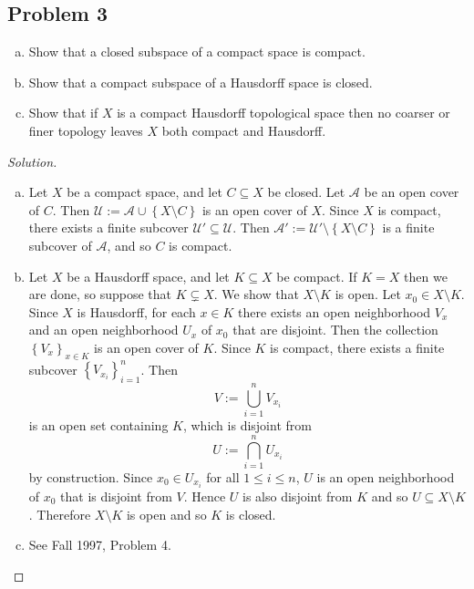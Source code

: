 \documentclass[12pt]{article}
\newcommand\setb[1]{\left \{ #1 \right \}}
\theoremstyle{definition}
\begin{document}
\subsection{Problem 3 \texorpdfstring{\cite{Munkres}}{}}
\begin{enumerate}[a)]
    \item Show that a closed subspace of a compact space is compact.
    \item Show that a compact subspace of a Hausdorff space is closed.
    \item Show that if $X$ is a compact Hausdorff topological space then no coarser or finer topology leaves $X$ both compact and Hausdorff.
\end{enumerate}
\begin{proof}[Solution]
    \noindent
    \begin{enumerate}[a)]
        \item Let $X$ be a compact space, and let $C \subseteq X$ be closed. Let $\mathcal{A}$ be an open cover of $C$. Then $\mathcal{U} := \mathcal{A} \cup \setb{ X \setminus C }$ is an open cover of $X$. Since $X$ is compact, there exists a finite subcover $\mathcal{U}' \subseteq \mathcal{U}$. Then $\mathcal{A}' :=  \mathcal{U}' \setminus \setb{ X \setminus C }$ is a finite subcover of $\mathcal{A}$, and so $C$ is compact.
        \item Let $X$ be a Hausdorff space, and let $K \subseteq X$ be compact. If $K = X$ then we are done, so suppose that $K \subsetneq X$. We show that $X \setminus K$ is open. Let $x_0 \in X \setminus K$. Since $X$ is Hausdorff, for each $x \in K$ there exists an open neighborhood $V_x$ and an open neighborhood $U_x$ of $x_0$ that are disjoint. Then the collection $\setb{ V_x }_{x \in K}$ is an open cover of $K$. Since $K$ is compact, there exists a finite subcover $\setb{ V_{x_i} }_{i = 1}^n$. Then 
        \[
            V := \bigcup\limits_{i = 1}^n V_{x_i}
        \]
        is an open set containing $K$, which is disjoint from 
        \[
            U := \bigcap\limits_{i = 1}^n U_{x_i}
        \]
        by construction. Since $x_0 \in U_{x_i}$ for all $1 \leq i \leq n$, $U$ is an open neighborhood of $x_0$ that is disjoint from $V$. Hence $U$ is also disjoint from $K$ and so $U \subseteq X \setminus K$. Therefore $X \setminus K$ is open and so $K$ is closed.
        \item See Fall 1997, Problem 4.
    \end{enumerate}
\end{proof}
\end{document}
